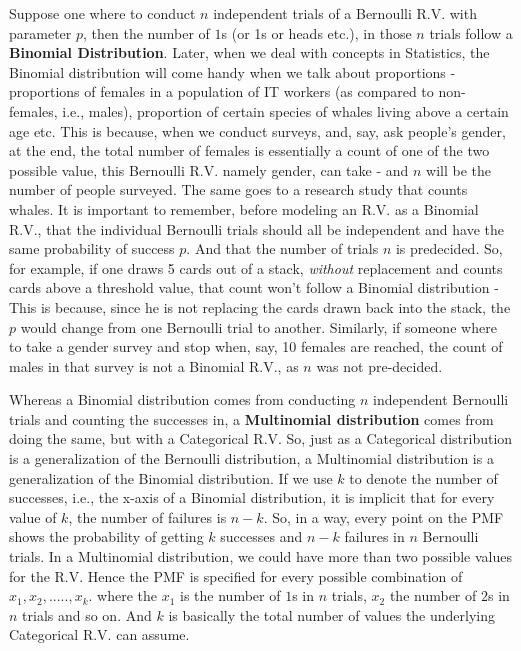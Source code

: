 Suppose one where to conduct $n$ independent trials of a Bernoulli R.V. with parameter $p$, then the number of $1$s (or 1s or heads etc.), in those $n$ trials follow a \textbf{Binomial Distribution}. Later, when we deal with concepts in Statistics, the Binomial distribution will come handy when we talk about proportions - proportions of females in a population of IT workers (as compared to non-females, i.e., males), proportion of certain species of whales living above a certain age etc. This is because, when we conduct surveys, and, say, ask people's gender, at the end, the total number of females is essentially a count of one of the two possible value, this Bernoulli R.V. namely gender, can take - and $n$ will be the number of people surveyed. The same goes to a research study that counts whales. It is important to remember, before modeling an R.V. as a Binomial R.V., that the individual Bernoulli trials should all be independent and have the same probability of success $p$. And that the number of trials $n$ is predecided. So, for example, if one draws 5 cards out of a stack, \emph{without} replacement and counts cards above a threshold value, that count won't follow a Binomial distribution - This is because, since he is not replacing the cards drawn back into the stack, the $p$ would change from one Bernoulli trial to another. Similarly, if someone where to take a gender survey and stop when, say, 10 females are reached, the count of males in that survey is not a Binomial R.V., as $n$ was not pre-decided. 

Whereas a Binomial distribution comes from conducting $n$ independent Bernoulli trials and counting the successes in, a \textbf{Multinomial distribution} comes from doing the same, but with a Categorical R.V. So, just as a Categorical distribution is a generalization of the Bernoulli distribution, a Multinomial distribution is a generalization of the Binomial distribution. If we use $k$ to denote the number of successes, i.e., the x-axis of a Binomial distribution, it is implicit that for every value of $k$, the number of failures is $n-k$. So, in a way, every point on the PMF shows the probability of getting $k$ successes and $n-k$ failures in $n$ Bernoulli trials. In a Multinomial distribution, we could have more than two possible values for the R.V. Hence the PMF is specified for every possible combination of $x_1, x_2, ....., x_k$. where the $x_1$ is the number of $1$s in $n$ trials, $x_2$ the number of $2$s in $n$ trials and so on. And $k$ is basically the total number of values the underlying Categorical R.V. can assume.

